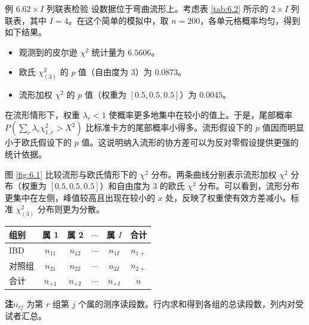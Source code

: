 \begin{statement}{例 6.6}{$2\times I$ 列联表检验}
设数据位于弯曲流形上。考虑表 \ref{tab:6.2} 所示的 $2\times I$ 列联表，其中 $I=4$。在这个简单的模拟中，取 $n=200$，各单元格概率均匀，得到如下结果。
\begin{itemize}
  \item 观测到的皮尔逊 $\chi^2$ 统计量为 $6.5606$。
  \item 欧氏 $\chi_{(3)}^2$ 的 $p$ 值（自由度为 $3$）为 $0.0873$。
  \item 流形加权 $\chi^2$ 的 $p$ 值（权重为 $[0.5,0.5,0.5]$）为 $0.0045$。
\end{itemize}
在流形情形下，权重 $\lambda_r<1$ 使概率更多地集中在较小的值上。于是，尾部概率 $P(\sum_r\lambda_r\chi_{1,r}^2>X^2)$ 比标准卡方的尾部概率小得多。流形假设下的 $p$ 值因而明显小于欧氏假设下的 $p$ 值。这说明纳入流形的协方差可以为反对零假设提供更强的统计依据。

图 \ref{fig:6.1} 比较流形与欧氏情形下的 $\chi^2$ 分布。两条曲线分别表示流形加权 $\chi^2$ 分布（权重为 $[0.5,0.5,0.5]$）和自由度为 3 的欧氏 $\chi^2$ 分布。可以看到，流形分布更集中在左侧，峰值较高且出现在较小的 $x$ 处，反映了权重使有效方差减小。标准 $\chi_{(3)}^2$ 分布则更为分散。
\end{statement}

\begin{table}[htbp]
  \centering
  \begin{tabular}{lccccc}
    \toprule
    组别 & 属 1 & 属 2 & $\cdots$ & 属 $I$ & 合计\\
    \midrule
    IBD & $n_{11}$ & $n_{12}$ & $\cdots$ & $n_{1I}$ & $n_{1+}$\\
    对照组 & $n_{21}$ & $n_{22}$ & $\cdots$ & $n_{2I}$ & $n_{2+}$\\
    合计 & $n_{+1}$ & $n_{+2}$ & $\cdots$ & $n_{+I}$ & $n$\\
    \bottomrule
  \end{tabular}\par
  \medskip
  \begin{minipage}{.85\linewidth}\small
    \textbf{注}\quad $n_{rj}$ 为第 $r$ 组第 $j$ 个属的测序读段数。行内求和得到各组的总读段数，列内对受试者汇总。
  \end{minipage}
\end{table}


